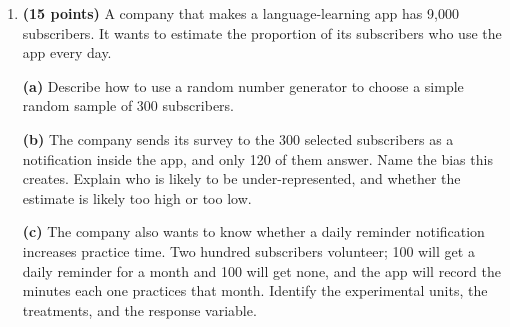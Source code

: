 \documentclass[12pt]{article}
\begin{document}
\begin{enumerate}[leftmargin=1.9em, itemsep=0.16in, resume]
        \vspace{6pt}
        \boxguard[17]
        \textbf{(e)} Use the residual plot to decide whether a linear model is appropriate for
        these data. Then explain why the owner should not use this line to predict the number
        of iced coffees sold on a 20$^\circ$F winter day.\\[4pt]

  \boxguard[26]
  \item \textbf{(15 points)} A company that makes a language-learning app has 9{,}000
        subscribers. It wants to estimate the proportion of its subscribers who use the app
        every day.

        \vspace{6pt}
        \textbf{(a)} Describe how to use a random number generator to choose a simple random
        sample of 300 subscribers.\\[4pt]

        \vspace{6pt}
        \boxguard[17]
        \textbf{(b)} The company sends its survey to the 300 selected subscribers as a
        notification inside the app, and only 120 of them answer. Name the bias this creates.
        Explain who is likely to be under-represented, and whether the estimate is likely too
        high or too low.\\[4pt]

        \vspace{6pt}
        \boxguard[18]
        \textbf{(c)} The company also wants to know whether a daily reminder notification
        increases practice time. Two hundred subscribers volunteer; 100 will get a daily
        reminder for a month and 100 will get none, and the app will record the minutes each
        one practices that month. Identify the experimental units, the treatments, and the
        response variable.\\[4pt]


\end{enumerate}
\end{document}
